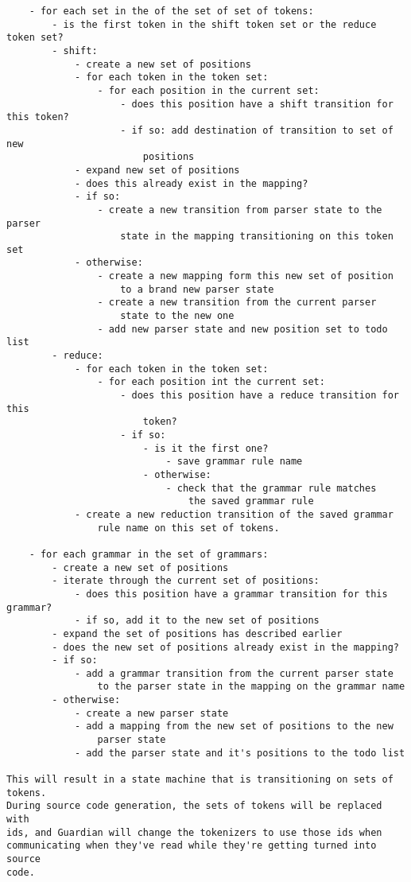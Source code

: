 {\begin{verbatim}
	- for each set in the of the set of set of tokens:
		- is the first token in the shift token set or the reduce token set?
		- shift:
			- create a new set of positions
			- for each token in the token set:
				- for each position in the current set:
					- does this position have a shift transition for this token?
					- if so: add destination of transition to set of new
						positions
			- expand new set of positions
			- does this already exist in the mapping?
			- if so:
				- create a new transition from parser state to the parser
					state in the mapping transitioning on this token set
			- otherwise:
				- create a new mapping form this new set of position
					to a brand new parser state
				- create a new transition from the current parser
					state to the new one
				- add new parser state and new position set to todo list
		- reduce:
			- for each token in the token set:
				- for each position int the current set:
					- does this position have a reduce transition for this
						token?
					- if so:
						- is it the first one?
							- save grammar rule name
						- otherwise:
							- check that the grammar rule matches
								the saved grammar rule
			- create a new reduction transition of the saved grammar
				rule name on this set of tokens.
	
	- for each grammar in the set of grammars:
		- create a new set of positions
		- iterate through the current set of positions:
			- does this position have a grammar transition for this grammar?
			- if so, add it to the new set of positions
		- expand the set of positions has described earlier
		- does the new set of positions already exist in the mapping?
		- if so:
			- add a grammar transition from the current parser state
				to the parser state in the mapping on the grammar name
		- otherwise:
			- create a new parser state
			- add a mapping from the new set of positions to the new
				parser state
			- add the parser state and it's positions to the todo list

This will result in a state machine that is transitioning on sets of tokens.
During source code generation, the sets of tokens will be replaced with
ids, and Guardian will change the tokenizers to use those ids when
communicating when they've read while they're getting turned into source
code.
\end{verbatim}
}

















